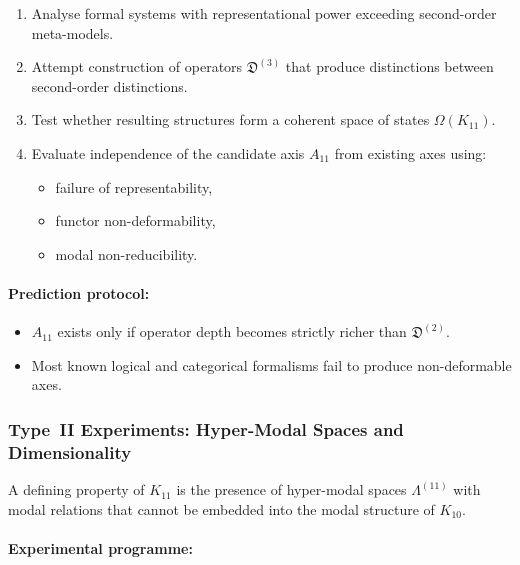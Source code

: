 \begin{enumerate}
    \item Analyse formal systems with representational power exceeding
          second-order meta-models.
    \item Attempt construction of operators $\mathfrak{D}^{(3)}$
          that produce distinctions between second-order distinctions.
    \item Test whether resulting structures form a coherent space
          of states $\Omega(K_{11})$.
    \item Evaluate independence of the candidate axis $A_{11}$ from
          existing axes using:
          \begin{itemize}
              \item failure of representability,
              \item functor non-deformability,
              \item modal non-reducibility.
          \end{itemize}
\end{enumerate}

\paragraph{Prediction protocol:}

\begin{itemize}
    \item $A_{11}$ exists only if operator depth becomes strictly
          richer than $\mathfrak{D}^{(2)}$.
    \item Most known logical and categorical formalisms fail to
          produce non-deformable axes.
\end{itemize}



\subsubsection{Type~II Experiments: Hyper-Modal Spaces and Dimensionality}

A defining property of $K_{11}$ is the presence of
hyper-modal spaces $\Lambda^{(11)}$ with modal relations that cannot
be embedded into the modal structure of $K_{10}$.

\paragraph{Experimental programme:}

